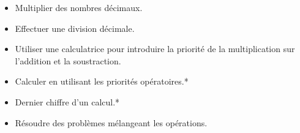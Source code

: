 \documentclass[a4paper,12pt,fleqn]{article}	
\begin{document}
\begin{itemize}
	\item {}Multiplier des nombres décimaux.
	\item {}Effectuer une division décimale.
	\item {}Utiliser une calculatrice pour introduire la priorité de la multiplication sur l’addition et la soustraction.
	\item {}Calculer en utilisant les priorités opératoires.*
	\item {}Dernier chiffre d’un calcul.*
	\item {}Résoudre des problèmes mélangeant les opérations. %

\end{itemize}


	
\end{document}
